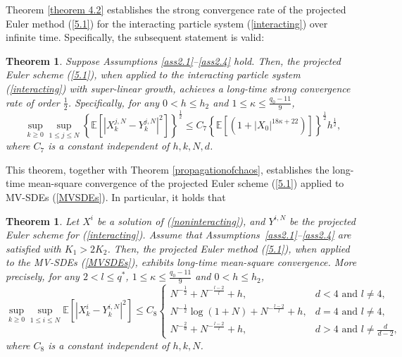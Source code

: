 \documentclass[12pt]{article}
\numberwithin{equation}{section}
\newtheorem{theorem}[assumption]{Theorem}   %
\begin{document}
Theorem \ref{theorem 4.2} establishes the strong convergence rate of the projected Euler method (\ref{5.1}) for the interacting particle system (\ref{interacting}) over infinite time. Specifically, the subsequent statement is valid:
  \begin{theorem}\label{theorem5.8}
Suppose Assumptions \ref{ass2.1}--\ref{ass2.4} hold. Then, the projected Euler scheme (\ref{5.1}), when applied to the interacting particle system (\ref{interacting}) with super-linear growth, achieves a long-time strong convergence rate of order $\tfrac{1}{2}$. Specifically, for any $0<h \leq h_2$ and $1\leq \kappa \leq \tfrac{q_0-11}{9}$, 
\begin{equation}\tag{3.23}\label{5.83}
\underset{k\geqslant0}{\sup}\underset{1\leqslant j\leqslant N}{\sup}\left\{\mathbb{E}\left[\left|X^{j,N}_k-Y^{j,N}_k\right|^{2}\right]\right\}^{\frac{1}{2}}\leq C_{7}\left\{\mathbb{E} \left[ \left( 1+\left| X_0 \right|^{18\kappa+22} \right) \right]\right\}^{\frac{1}{2}} h^{\frac{1}{2}},
\end{equation}
where $C_{7}$ is a constant independent of $h,k,N,d$.
\end{theorem}

This theorem, together  with Theorem \ref{propagationofchaos}, establishes the long-time mean-square convergence  of the projected Euler scheme  (\ref{5.1}) applied to MV-SDEs (\ref{MVSDEs}). In particular, it holds that

\begin{theorem}\label{theorem5.9}
Let $X^{i}$ be a solution of  (\ref{noninteracting}), and $Y^{i,N}$ be the projected Euler scheme for (\ref{interacting}). Assume that Assumptions~\ref{ass2.1}--\ref{ass2.4} are satisfied with $K_1 > 2K_2$. Then, the projected Euler method (\ref{5.1}), when applied to the MV-SDEs (\ref{MVSDEs}), exhibits long-time mean-square convergence. More precisely, for any $2<l\leq q^*$, $1\leq \kappa \leq \tfrac{q_0-11}{9}$ and $0<h \leq h_2$,  
\begin{equation}\tag{3.24}\label{5.84}
\underset{k\geqslant0}{\sup}\underset{1\leqslant i\leqslant N}{\sup}\mathbb{E}\left[\left|X_k^i-Y_k^{i, N}\right|^2\right] 
\leq C_8 \begin{cases}N^{-\frac{1}{2}}+N^{-\frac{{l}-2}{l}}+h, & d<4 \text { and } {l} \neq 4, \\ N^{-\frac{1}{2}} \log \left(1+N\right)+N^{-\frac{{l}-2}{{l}}}+h, & d=4 \text { and } {l} \neq 4, \\ N^{-\frac{2}{d}}+N^{-\frac{{l}-2}{l}}+h, & d>4 \text { and } {l} \neq \frac{d}{d-2} ,\end{cases}
\end{equation}
where $C_8$ is a constant independent of $h,k,N$.
\end{theorem}
\end{document}
